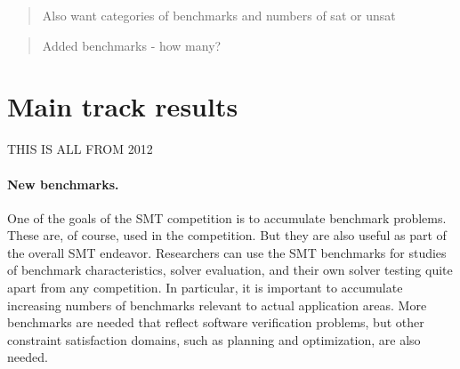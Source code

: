 \documentclass[twosize,11pt]{article}
\newcommand{\comment}[2]{\begin{quote}\sc #1\marginpar{\textcolor{red}{$\ast^{\mbox{#2}}$}}\end{quote}}
\newcommand{\tjark}[1]{\comment{#1}{TW}}
\newcommand{\tjarkx}[1]{\tjark{#1}}
\begin{document}
\tjarkx{Also want categories of benchmarks and numbers of sat or unsat}

\tjarkx{Added benchmarks - how many? }

\section{Main track results}
\label{sec:main-results}

THIS IS ALL FROM 2012

\paragraph{New benchmarks.} One of the goals of the SMT competition is to accumulate benchmark problems. These are, of course, used in the competition. But they are also useful as part of the overall SMT endeavor. Researchers can use the SMT benchmarks for studies of benchmark characteristics, solver evaluation, and their own solver testing quite apart from any competition. In particular, it is important to accumulate increasing numbers of benchmarks relevant to actual application areas. More benchmarks are needed that reflect software verification problems, but other constraint satisfaction domains, such as planning and optimization, are also needed.
\end{document}
